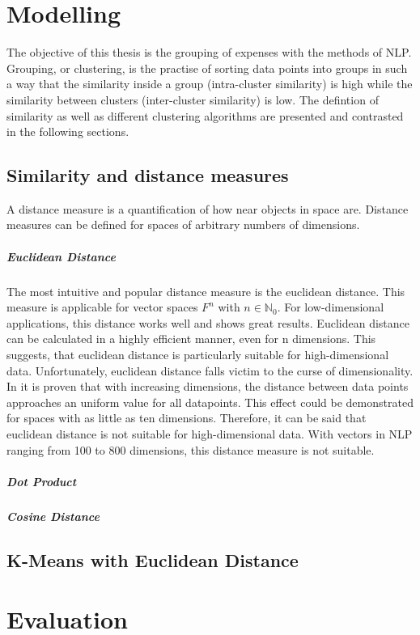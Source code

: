 \section{Modelling}
	The objective of this thesis is the grouping of expenses with the methods of \ac{NLP}. Grouping, or clustering, is the practise of sorting data points into groups in such a way that the similarity inside a group (intra-cluster similarity) is high while the similarity between clusters (inter-cluster similarity) is low. The defintion of similarity as well as different clustering algorithms are presented and contrasted in the following sections.
	
	\subsection{Similarity and distance measures}
	A distance measure is a quantification of how near objects in space are. Distance measures can be defined for spaces of arbitrary numbers of dimensions. 
	
	
	
	\subparagraph{Euclidean Distance} \label{euclidean}
	The most intuitive and popular distance measure is the euclidean distance. This measure is applicable for vector spaces $F^{n}$ with $n \in \mathbb{N}_0 $. For low-dimensional applications, this distance works well and shows great results. Euclidean distance can be calculated in a highly efficient manner, even for n dimensions. This suggests, that euclidean distance is particularly suitable for high-dimensional data. Unfortunately, euclidean distance falls victim to the curse of dimensionality. In \cite{beyerNearestNeighbor} it is proven that with increasing dimensions, the distance between data points approaches an uniform value for all datapoints. This effect could be demonstrated for spaces with as little as ten dimensions. Therefore, it can be said that euclidean distance is not suitable for high-dimensional data. With vectors in \ac{NLP} ranging from 100 to 800 dimensions, this distance measure is not suitable.
	
	\subparagraph{Dot Product}
	
	
	\subparagraph{Cosine Distance}
	
	
	\subsection{K-Means with Euclidean Distance}
\section{Evaluation}
